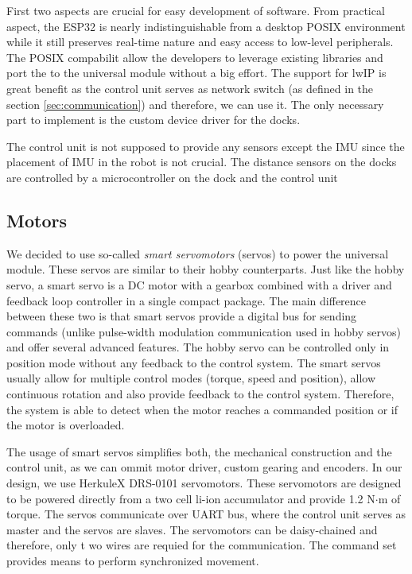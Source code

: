 First two aspects are crucial for easy development of software. From practical
aspect, the ESP32 is nearly indistinguishable from a desktop POSIX environment
while it still preserves real-time nature and easy access to low-level
peripherals. The POSIX compabilit allow the developers to leverage existing
libraries and port the to the universal module without a big effort. The support
for lwIP is great benefit as the control unit serves as network switch (as
defined in the section \ref{sec:communication}) and therefore, we can use it.
The only necessary part to implement is the custom device driver for the docks.

The control unit is not supposed to provide any sensors except the IMU since the
placement of IMU in the robot is not crucial. The distance sensors on the docks
are controlled by a microcontroller on the dock and the control unit


\subsection{Motors}

We decided to use so-called \emph{smart servomotors} (servos) to power the
universal module. These servos are similar to their hobby counterparts. Just
like the hobby servo, a smart servo is a DC motor with a gearbox combined with a
driver and feedback loop controller in a single compact package. The main
difference between these two is that smart servos provide a digital bus for
sending commands (unlike pulse-width modulation communication used in hobby
servos) and offer several advanced features. The hobby servo can be controlled
only in position mode without any feedback to the control system. The smart
servos usually allow for multiple control modes (torque, speed and position),
allow continuous rotation and also provide feedback to the control system.
Therefore, the system is able to detect when the motor reaches a commanded
position or if the motor is overloaded.

The usage of smart servos simplifies both, the mechanical construction and the
control unit, as we can ommit motor driver, custom gearing and encoders. In our
design, we use HerkuleX DRS-0101 servomotors. These servomotors are
designed to be powered directly from a two cell li-ion accumulator and provide
1.2 N$\cdot$m of torque. The servos communicate over UART bus, where the control
unit serves as master and the servos are slaves. The servomotors can be
daisy-chained and therefore, only t wo wires are requied for the communication.
The command set provides means to perform synchronized movement.

